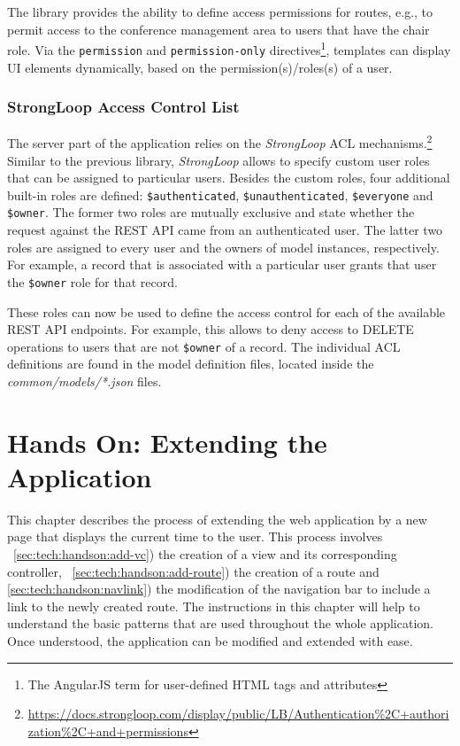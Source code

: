 \documentclass[nochapterpage,nopartpage,noheadingspace,numbersubsubsec,bigchapter,colorback,accentcolor=tud9c,10pt]{tudreport}
\begin{document}
    The library provides the ability to define access permissions for routes, e.g., to permit access to the conference management area to users that have the chair role. Via the \texttt{permission} and \texttt{permission-only} directives\footnote{The AngularJS term for user-defined HTML tags and attributes}, templates can display UI elements dynamically, based on the permission(s)/roles(s) of a user.

  \subsection{StrongLoop Access Control List}
  \label{sec:tech:implementation:acl:strongloop-acl}

    The server part of the application relies on the \emph{StrongLoop} ACL mechanisms.\footnote{\url{https://docs.strongloop.com/display/public/LB/Authentication\%2C+authorization\%2C+and+permissions}} Similar to the previous library, \emph{StrongLoop} allows to specify custom user roles that can be assigned to particular users. Besides the custom roles, four additional built-in roles are defined: \texttt{\$authenticated}, \texttt{\$unauthenticated}, \texttt{\$everyone} and \texttt{\$owner}. The former two roles are mutually exclusive and state whether the request against the REST API came from an authenticated user. The latter two roles are assigned to every user and the owners of model instances, respectively. For example, a record that is associated with a particular user grants that user the \texttt{\$owner} role for that record.

    These roles can now be used to define the access control for each of the available REST API endpoints. For example, this allows to deny access to DELETE operations to users that are not \texttt{\$owner} of a record. The individual ACL definitions are found in the model definition files, located inside the \emph{common/models/*.json} files.

  \chapter{Hands On: Extending the Application}
  \label{ch:tech:handson}

    This chapter describes the process of extending the web application by a new page that displays the current time to the user. This process involves ~\ref{sec:tech:handson:add-vc}) the creation of a view and its corresponding controller, ~\ref{sec:tech:handson:add-route}) the creation of a route and \ref{sec:tech:handson:navlink}) the modification of the navigation bar to include a link to the newly created route. The instructions in this chapter will help to understand the basic patterns that are used throughout the whole application. Once understood, the application can be modified and extended with ease.
\end{document}
